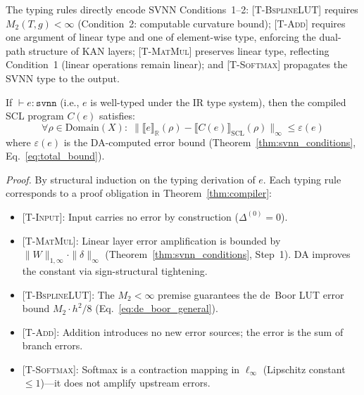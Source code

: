 The typing rules directly encode SVNN Conditions~1--2:
\textsc{[T-BsplineLUT]} requires $M_2(T,g) < \infty$ (Condition~2:
computable curvature bound); \textsc{[T-Add]} requires one argument
of linear type and one of element-wise type, enforcing the dual-path
structure of KAN layers; \textsc{[T-MatMul]} preserves linear type,
reflecting Condition~1 (linear operations remain linear); and
\textsc{[T-Softmax]} propagates the SVNN type to the output.

\vspace{4pt}
\begin{kingthm}
\label{thm:ir-soundness}
If $\vdash e : \texttt{svnn}$ (i.e., $e$ is well-typed under the
IR type system), then the compiled SCL program $C(e)$ satisfies:
\begin{equation}
\forall \rho \in \text{Domain}(X):\;
\|\llbracket e \rrbracket_{\mathbb{R}}(\rho) -
\llbracket C(e) \rrbracket_{\text{SCL}}(\rho)\|_\infty
\leq \varepsilon(e)
\label{eq:type_soundness}
\end{equation}
where $\varepsilon(e)$ is the DA-computed error bound
(Theorem~\ref{thm:svnn_conditions}, Eq.~\ref{eq:total_bound}).
\end{kingthm}

\vspace{2pt}
\noindent\textit{Proof.}
By structural induction on the typing derivation of $e$.
Each typing rule corresponds to a proof obligation in
Theorem~\ref{thm:compiler}:

\begin{itemize}
    \item \textsc{[T-Input]}: Input carries no error by construction
    ($\Delta^{(0)} = 0$).

    \item \textsc{[T-MatMul]}: Linear layer error amplification is
    bounded by $\|W\|_{1,\infty} \cdot \|\delta\|_\infty$
    (Theorem~\ref{thm:svnn_conditions}, Step~1). DA improves the
    constant via sign-structural tightening.

    \item \textsc{[T-BsplineLUT]}: The $M_2 < \infty$ premise
    guarantees the de~Boor LUT error bound
    $M_2 \cdot h^2 / 8$ (Eq.~\ref{eq:de_boor_general}).

    \item \textsc{[T-Add]}: Addition introduces no new error
    sources; the error is the sum of branch errors.

    \item \textsc{[T-Softmax]}: Softmax is a contraction mapping
    in $\ell_\infty$ (Lipschitz constant $\leq 1$)---it does not
    amplify upstream errors.
\end{itemize}

